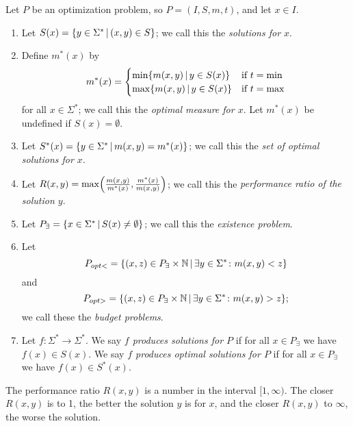 \documentclass[]{article}
\newcommand{\lb}{\left\{}
\newcommand{\rb}{\right\}}
\newcommand{\st}{\,\middle|\,}
\let\originalleft\left
\let\originalright\right
\renewcommand{\left}{\mathopen{}\mathclose\bgroup\originalleft}
\renewcommand{\right}{\aftergroup\egroup\originalright}
\begin{document}
\begin{definition}
  Let $P$ be an optimization problem, so $P = (I, S, m, t)$, and let $x \in I$.
  \begin{enumerate}
  \item Let $S(x)=\lb y \in \Sigma^* \st (x, y) \in S \rb$; we call this the \emph{solutions for $x$}.
  \item Define $m^*(x)$ by
    \begin{displaymath}
      m^*(x) =
      \begin{cases}
        \min \lb m(x, y) \st y \in S(x) \rb & \text{if } t = \min \\
        \max \lb m(x, y) \st y \in S(x) \rb & \text{if } t = \max
      \end{cases}
    \end{displaymath}
    for all $x \in \Sigma^*$; we call this the \emph{optimal measure for $x$}.
    Let $m^*(x)$ be undefined if $S(x) = \emptyset$.
  \item Let $S^*(x) = \lb y \in \Sigma^* \st m(x, y) = m^*(x) \rb$; we call this the \emph{set of optimal solutions for $x$}.
  \item Let $R(x, y) = \max \left(\frac{m(x, y)}{m^*(x)}, \frac{m^*(x)}{m(x, y)}\right)$; we call this the \emph{performance ratio of the solution $y$}.
  \item Let $P_\exists = \lb x \in \Sigma^* \st S(x) \neq \emptyset \rb$; we call this the \emph{existence problem}.
  \item Let
    \begin{displaymath}
      P_{opt<} = \lb (x, z) \in P_\exists \times \mathbb{N} \st \exists y \in \Sigma^* \colon m(x, y) < z \rb
    \end{displaymath}
    and
    \begin{displaymath}
      P_{opt>}=\lb (x, z) \in P_\exists \times \mathbb{N} \st \exists y \in \Sigma^* \colon m(x, y) > z \rb;
    \end{displaymath}
    we call these the \emph{budget problems}.
  \item Let $f \colon \Sigma^* \to \Sigma^*$.
    We say \emph{$f$ produces solutions for $P$} if for all $x \in P_\exists$ we have $f(x) \in S(x)$.
    We say \emph{$f$ produces optimal solutions for $P$} if for all $x \in P_\exists$ we have $f(x) \in S^*(x)$.
  \end{enumerate}
\end{definition}

The performance ratio $R(x, y)$ is a number in the interval $[1, \infty)$.
The closer $R(x, y)$ is to 1, the better the solution $y$ is for $x$, and the closer $R(x, y)$ to $\infty$, the worse the solution.
\end{document}
